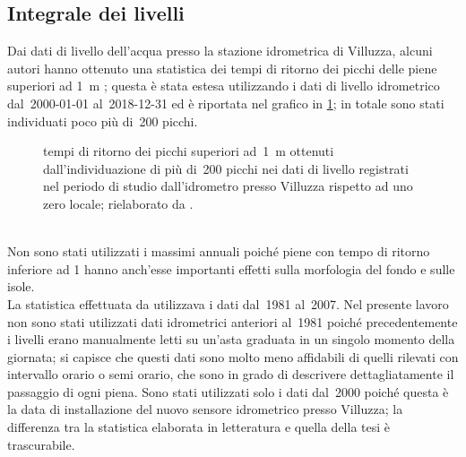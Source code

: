\subsection{Integrale dei livelli}
Dai dati di livello dell'acqua presso la stazione idrometrica di Villuzza, alcuni autori hanno ottenuto una statistica dei tempi di ritorno dei picchi delle piene superiori ad \SI{1}{\m} ; questa è stata estesa utilizzando i dati di livello idrometrico dal~2000-01-01 al~2018-12-31 ed è riportata nel grafico in \cref{graph:tr-picchi}; in totale sono stati individuati poco più di~200 picchi.
%
\begin{figure}
	\centering
	
	\caption[tempi di ritorno dei picchi superiori ad \SI{1}{\m}]{tempi di ritorno dei picchi superiori ad~\SI{1}{\m} ottenuti dall'individuazione di più di~200 picchi nei dati di livello registrati nel periodo di studio dall'idrometro presso Villuzza rispetto ad uno zero locale; rielaborato da .}
	\label{graph:tr-picchi}
\end{figure}
%
\\
Non sono stati utilizzati i massimi annuali poiché piene con tempo di ritorno inferiore ad \SI{1}{\anno} hanno anch'esse importanti effetti sulla morfologia del fondo e sulle isole.
\\
La statistica effettuata da  utilizzava i dati dal~1981 al~2007.
Nel presente lavoro non sono stati utilizzati dati idrometrici anteriori al~1981 poiché precedentemente i livelli erano manualmente letti su un'asta graduata in un singolo momento della giornata; si capisce che questi dati sono molto meno affidabili di quelli rilevati con intervallo orario o semi orario, che sono in grado di descrivere dettagliatamente il passaggio di ogni piena.
Sono stati utilizzati solo i dati dal~2000 poiché questa è la data di installazione del nuovo sensore idrometrico presso Villuzza; la differenza tra la statistica elaborata in letteratura e quella della tesi è trascurabile.

